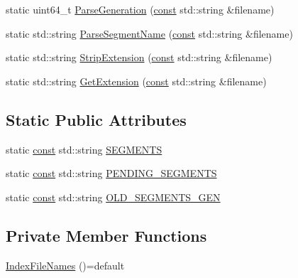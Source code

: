 \begin{DoxyCompactItemize}
\item 
static uint64\+\_\+t \mbox{\hyperlink{classlucene_1_1core_1_1index_1_1IndexFileNames_a4e9fe2bd5da0cf8dfd38f0ee90caa302}{Parse\+Generation}} (\mbox{\hyperlink{ZlibCrc32_8h_a2c212835823e3c54a8ab6d95c652660e}{const}} std\+::string \&filename)
\item 
static std\+::string \mbox{\hyperlink{classlucene_1_1core_1_1index_1_1IndexFileNames_a677cddeb80a0f482875f759ea8856ee9}{Parse\+Segment\+Name}} (\mbox{\hyperlink{ZlibCrc32_8h_a2c212835823e3c54a8ab6d95c652660e}{const}} std\+::string \&filename)
\item 
static std\+::string \mbox{\hyperlink{classlucene_1_1core_1_1index_1_1IndexFileNames_a256288c7ed34b82a6d43143f0c2f4f3d}{Strip\+Extension}} (\mbox{\hyperlink{ZlibCrc32_8h_a2c212835823e3c54a8ab6d95c652660e}{const}} std\+::string \&filename)
\item 
static std\+::string \mbox{\hyperlink{classlucene_1_1core_1_1index_1_1IndexFileNames_a7a867411b8b94d69716f3152297d6d73}{Get\+Extension}} (\mbox{\hyperlink{ZlibCrc32_8h_a2c212835823e3c54a8ab6d95c652660e}{const}} std\+::string \&filename)
\end{DoxyCompactItemize}
\subsection*{Static Public Attributes}
\begin{DoxyCompactItemize}
\item 
static \mbox{\hyperlink{ZlibCrc32_8h_a2c212835823e3c54a8ab6d95c652660e}{const}} std\+::string \mbox{\hyperlink{classlucene_1_1core_1_1index_1_1IndexFileNames_a18a9f0e75647cf4fa3e185c410f5e959}{S\+E\+G\+M\+E\+N\+TS}}
\item 
static \mbox{\hyperlink{ZlibCrc32_8h_a2c212835823e3c54a8ab6d95c652660e}{const}} std\+::string \mbox{\hyperlink{classlucene_1_1core_1_1index_1_1IndexFileNames_a80dc72abef3c3e48cfd2d3191693d97e}{P\+E\+N\+D\+I\+N\+G\+\_\+\+S\+E\+G\+M\+E\+N\+TS}}
\item 
static \mbox{\hyperlink{ZlibCrc32_8h_a2c212835823e3c54a8ab6d95c652660e}{const}} std\+::string \mbox{\hyperlink{classlucene_1_1core_1_1index_1_1IndexFileNames_a61fd984fff8ce5a97c6561b4e0f8e532}{O\+L\+D\+\_\+\+S\+E\+G\+M\+E\+N\+T\+S\+\_\+\+G\+EN}}
\end{DoxyCompactItemize}
\subsection*{Private Member Functions}
\begin{DoxyCompactItemize}
\item 
\mbox{\hyperlink{classlucene_1_1core_1_1index_1_1IndexFileNames_aaf6d211ff93a1383d10b900648e620b7}{Index\+File\+Names}} ()=default
\end{DoxyCompactItemize}


